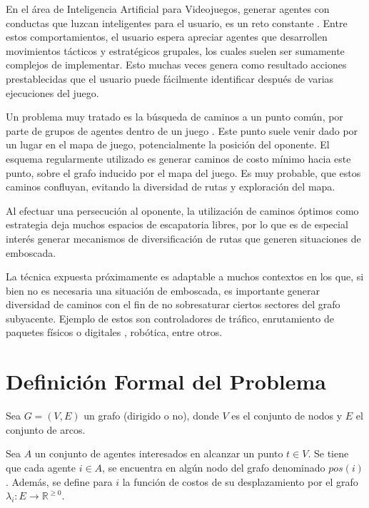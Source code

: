 \documentclass{egpubl}
\begin{document}
En el área de Inteligencia Artificial para Videojuegos, generar
agentes con conductas que luzcan inteligentes para el
usuario, es un reto constante \cite{MF09}. Entre estos comportamientos,
el usuario espera apreciar agentes que desarrollen movimientos
tácticos y estratégicos grupales, los cuales suelen ser sumamente
complejos de implementar. Esto muchas veces genera como resultado
acciones prestablecidas que el usuario puede fácilmente identificar después
de varias ejecuciones del juego.

Un problema muy tratado es la búsqueda de caminos a un punto común,
por parte de grupos de agentes dentro de un juego \cite{MF09}. Este punto suele
venir dado por un lugar en el mapa de juego, potencialmente la
posición del oponente.
El esquema regularmente utilizado es generar caminos de costo mínimo
\cite{HNR72} \cite{RN93}
hacia este punto, sobre el grafo inducido por el mapa del juego. Es
muy probable, que estos caminos confluyan, evitando la diversidad de
rutas y exploración del mapa.

Al efectuar una persecución al oponente, la utilización de caminos
óptimos como estrategia deja muchos espacios de escapatoria libres,
por lo que es de especial interés generar mecanismos de diversificación de
rutas que generen situaciones de emboscada.

La técnica expuesta próximamente es adaptable a muchos contextos en
los que, si bien no es necesaria una situación de emboscada, es
importante generar diversidad de caminos con el fin de no sobresaturar
ciertos sectores del grafo subyacente. Ejemplo de estos son controladores
de tráfico, enrutamiento de paquetes físicos o digitales \cite{TMSV03},
robótica, entre otros.


\section{Definición Formal del Problema}

Sea $G = (V,E)$ un grafo (dirigido o no), donde
$V$ es el conjunto de nodos y $E$
el conjunto de arcos.

Sea $A$ un conjunto de agentes
interesados en alcanzar un punto $t \in V$. Se tiene
que cada agente $i \in A$, se encuentra en algún nodo del grafo
denominado $pos(i)$. Además, se define para $i$ la función
de costos de su desplazamiento por el grafo
$\lambda_i : E \longrightarrow \mathbb{R}^{\geq 0}$.
\end{document}
